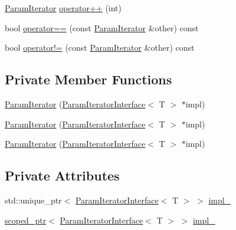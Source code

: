 \begin{DoxyCompactItemize}
\mbox{\hyperlink{classtesting_1_1internal_1_1_param_iterator}{Param\+Iterator}} \mbox{\hyperlink{classtesting_1_1internal_1_1_param_iterator_af51e17827dd54977165937550c0fb030}{operator++}} (int)
\item 
bool \mbox{\hyperlink{classtesting_1_1internal_1_1_param_iterator_adc356b4789eb0c2a1b5b033c7874e5a6}{operator==}} (const \mbox{\hyperlink{classtesting_1_1internal_1_1_param_iterator}{Param\+Iterator}} \&other) const
\item 
bool \mbox{\hyperlink{classtesting_1_1internal_1_1_param_iterator_a7a6aee04e8e44b5c8294929951cfac2b}{operator!=}} (const \mbox{\hyperlink{classtesting_1_1internal_1_1_param_iterator}{Param\+Iterator}} \&other) const
\end{DoxyCompactItemize}
\subsection*{Private Member Functions}
\begin{DoxyCompactItemize}
\item 
\mbox{\hyperlink{classtesting_1_1internal_1_1_param_iterator_acf5ad898e7f50eb82a6c367889aa07c4}{Param\+Iterator}} (\mbox{\hyperlink{classtesting_1_1internal_1_1_param_iterator_interface}{Param\+Iterator\+Interface}}$<$ T $>$ $\ast$impl)
\item 
\mbox{\hyperlink{classtesting_1_1internal_1_1_param_iterator_acf5ad898e7f50eb82a6c367889aa07c4}{Param\+Iterator}} (\mbox{\hyperlink{classtesting_1_1internal_1_1_param_iterator_interface}{Param\+Iterator\+Interface}}$<$ T $>$ $\ast$impl)
\item 
\mbox{\hyperlink{classtesting_1_1internal_1_1_param_iterator_acf5ad898e7f50eb82a6c367889aa07c4}{Param\+Iterator}} (\mbox{\hyperlink{classtesting_1_1internal_1_1_param_iterator_interface}{Param\+Iterator\+Interface}}$<$ T $>$ $\ast$impl)
\end{DoxyCompactItemize}
\subsection*{Private Attributes}
\begin{DoxyCompactItemize}
\item 
std\+::unique\+\_\+ptr$<$ \mbox{\hyperlink{classtesting_1_1internal_1_1_param_iterator_interface}{Param\+Iterator\+Interface}}$<$ T $>$ $>$ \mbox{\hyperlink{classtesting_1_1internal_1_1_param_iterator_aa38fe424573224620673876190e37b24}{impl\+\_\+}}
\item 
\mbox{\hyperlink{classtesting_1_1internal_1_1scoped__ptr}{scoped\+\_\+ptr}}$<$ \mbox{\hyperlink{classtesting_1_1internal_1_1_param_iterator_interface}{Param\+Iterator\+Interface}}$<$ T $>$ $>$ \mbox{\hyperlink{classtesting_1_1internal_1_1_param_iterator_ad135238185ed6bf4fb1cfafc2d3d1875}{impl\+\_\+}}
\end{DoxyCompactItemize}
